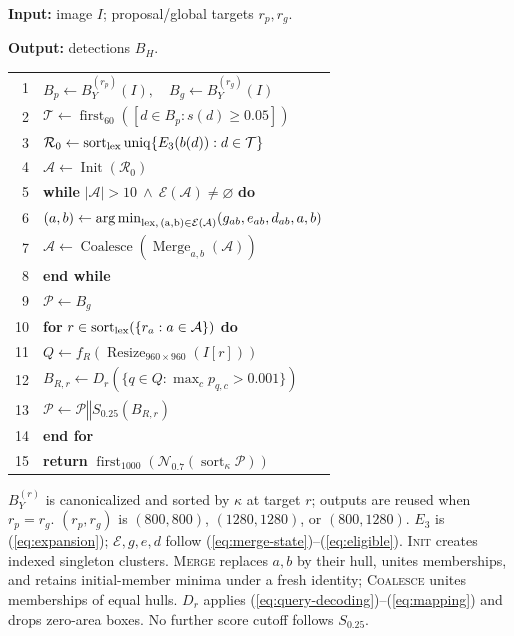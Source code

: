\documentclass[journal]{IEEEtran}
\begin{document}
\begin{algorithm}[t]
\caption{HyCADO inference with fixed detectors $f_Y,f_R$}
\label{alg:inference}
\small
\textbf{Input:} image $I$; proposal/global targets $r_p,r_g$.\par
\textbf{Output:} detections $B_H$.\par\smallskip
\begin{tabular}{@{}r@{\quad}l@{}}
1 & $B_p\gets B_Y^{(r_p)}(I),\quad B_g\gets B_Y^{(r_g)}(I)$\\[2pt]
2 & $\mathcal T\gets\operatorname{first}_{60}([d\in B_p:s(d)\geq0.05])$\\[2pt]
3 & $\mathcal R_0\gets\operatorname{sort}_{\rm lex}\operatorname{uniq}\{E_3(b(d)):d\in\mathcal T\}$\\[2pt]
4 & $\mathcal A\gets\operatorname{Init}(\mathcal R_0)$\\[2pt]
5 & \textbf{while} $|\mathcal A|>10\ \land\ \mathcal E(\mathcal A)\ne\varnothing$ \textbf{do}\\[2pt]
6 & \quad $(a,b)\gets\operatorname*{arg\,min}_{\rm lex,\,(a,b)\in\mathcal E(\mathcal A)}(g_{ab},e_{ab},d_{ab},a,b)$\\[2pt]
7 & \quad $\mathcal A\gets\operatorname{Coalesce}(\operatorname{Merge}_{a,b}(\mathcal A))$\\[2pt]
8 & \textbf{end while}\\[2pt]
9 & $\mathcal P\gets B_g$\\[2pt]
10 & \textbf{for} $r\in\operatorname{sort}_{\rm lex}(\{r_a:a\in\mathcal A\})$ \textbf{do}\\[2pt]
11 & \quad $Q\gets f_R(\operatorname{Resize}_{960\times960}(I[r]))$\\[2pt]
12 & \quad $B_{R,r}\gets D_r(\{q\in Q:\max_c p_{q,c}>0.001\})$\\[2pt]
13 & \quad $\mathcal P\gets\mathcal P\mathbin{\Vert}S_{0.25}(B_{R,r})$\\[2pt]
14 & \textbf{end for}\\[2pt]
15 & \textbf{return} $\operatorname{first}_{1000}(\mathcal N_{0.7}(\operatorname{sort}_{\kappa}\mathcal P))$
\end{tabular}\par\smallskip
\footnotesize
$B_Y^{(r)}$ is canonicalized and sorted by $\kappa$ at target $r$; outputs are reused when $r_p=r_g$. $(r_p,r_g)$ is $(800,800)$, $(1280,1280)$, or $(800,1280)$. $E_3$ is (\ref{eq:expansion}); $\mathcal E,g,e,d$ follow (\ref{eq:merge-state})--(\ref{eq:eligible}).
\textsc{Init} creates indexed singleton clusters. \textsc{Merge} replaces $a,b$ by their hull, unites memberships, and retains initial-member minima under a fresh identity;
\textsc{Coalesce} unites memberships of equal hulls. $D_r$ applies
(\ref{eq:query-decoding})--(\ref{eq:mapping}) and drops zero-area boxes.
No further score cutoff follows $S_{0.25}$.
\end{algorithm}
\end{document}
